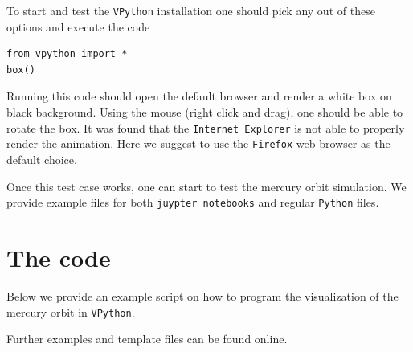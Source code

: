 \documentclass[12pt,ngerman,american]{iopart}
\newcommand{\python}[0]{\texttt{Python}}
\newcommand{\vpython}[0]{\texttt{VPython}}
\begin{document}
To start and test the \vpython{} installation one should pick any out of these options and execute the code
\begin{lstlisting}
from vpython import *
box()
\end{lstlisting}
Running this code should open the default browser and render a white box on black background.
Using the mouse (right click and drag), one should be able to rotate the box.
It was found that the \texttt{Internet Explorer} is not able to properly render the animation.
Here we suggest to use the \texttt{Firefox} web-browser as the default choice.

Once this test case works, one can start to test the mercury orbit simulation.
We provide example files for both \texttt{juypter notebooks} and regular \python{} files.




\clearpage
\section{The code}\label{sec:code}
Below we provide an example script on how to program the visualization of the mercury orbit in \vpython{}.

Further examples and template files can be found online\cite{}.
\end{document}
